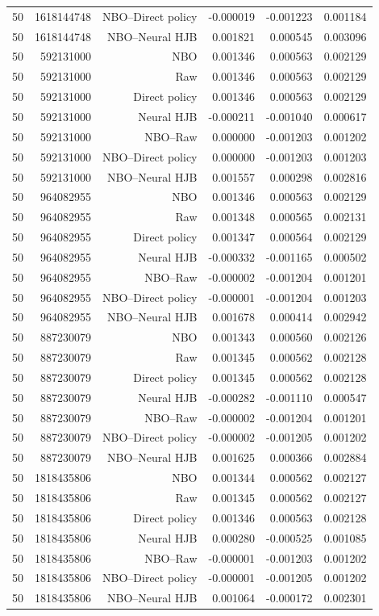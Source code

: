 \begin{longtable}{lrrrrr}
50 & 1618144748 & NBO--Direct policy & -0.000019 & -0.001223 & 0.001184 \\
50 & 1618144748 & NBO--Neural HJB & 0.001821 & 0.000545 & 0.003096 \\
50 & 592131000 & NBO & 0.001346 & 0.000563 & 0.002129 \\
50 & 592131000 & Raw & 0.001346 & 0.000563 & 0.002129 \\
50 & 592131000 & Direct policy & 0.001346 & 0.000563 & 0.002129 \\
50 & 592131000 & Neural HJB & -0.000211 & -0.001040 & 0.000617 \\
50 & 592131000 & NBO--Raw & 0.000000 & -0.001203 & 0.001202 \\
50 & 592131000 & NBO--Direct policy & 0.000000 & -0.001203 & 0.001203 \\
50 & 592131000 & NBO--Neural HJB & 0.001557 & 0.000298 & 0.002816 \\
50 & 964082955 & NBO & 0.001346 & 0.000563 & 0.002129 \\
50 & 964082955 & Raw & 0.001348 & 0.000565 & 0.002131 \\
50 & 964082955 & Direct policy & 0.001347 & 0.000564 & 0.002129 \\
50 & 964082955 & Neural HJB & -0.000332 & -0.001165 & 0.000502 \\
50 & 964082955 & NBO--Raw & -0.000002 & -0.001204 & 0.001201 \\
50 & 964082955 & NBO--Direct policy & -0.000001 & -0.001204 & 0.001203 \\
50 & 964082955 & NBO--Neural HJB & 0.001678 & 0.000414 & 0.002942 \\
50 & 887230079 & NBO & 0.001343 & 0.000560 & 0.002126 \\
50 & 887230079 & Raw & 0.001345 & 0.000562 & 0.002128 \\
50 & 887230079 & Direct policy & 0.001345 & 0.000562 & 0.002128 \\
50 & 887230079 & Neural HJB & -0.000282 & -0.001110 & 0.000547 \\
50 & 887230079 & NBO--Raw & -0.000002 & -0.001204 & 0.001201 \\
50 & 887230079 & NBO--Direct policy & -0.000002 & -0.001205 & 0.001202 \\
50 & 887230079 & NBO--Neural HJB & 0.001625 & 0.000366 & 0.002884 \\
50 & 1818435806 & NBO & 0.001344 & 0.000562 & 0.002127 \\
50 & 1818435806 & Raw & 0.001345 & 0.000562 & 0.002127 \\
50 & 1818435806 & Direct policy & 0.001346 & 0.000563 & 0.002128 \\
50 & 1818435806 & Neural HJB & 0.000280 & -0.000525 & 0.001085 \\
50 & 1818435806 & NBO--Raw & -0.000001 & -0.001203 & 0.001202 \\
50 & 1818435806 & NBO--Direct policy & -0.000001 & -0.001205 & 0.001202 \\
50 & 1818435806 & NBO--Neural HJB & 0.001064 & -0.000172 & 0.002301 \\
\bottomrule
\end{longtable}
